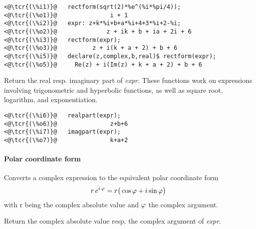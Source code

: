 \documentclass[../Maxima_Workbook.tex]{subfiles}
\begin{document}
\vspace{2mm}\begin{lstlisting}
<@\tcr{(\%i1)}@   rectform(sqrt(2)*%e^(%i*%pi/4));
<@\tcr{(\%o1)}@			      i + 1
<@\tcr{(\%i2)}@   expr: z+k*%i+b+a*%i+4+3*%i+2-%i;
<@\tcr{(\%o2)}@   		     z + ik + b + ia + 2i + 6
<@\tcr{(\%i3)}@   rectform(expr);
<@\tcr{(\%o3)}@		     z + i(k + a + 2) + b + 6
<@\tcr{(\%i5)}@   declare(z,complex,b,real)$ rectform(expr);
<@\tcr{(\%o5)}@		Re(z) + i(Im(z) + k + a + 2) + b + 6  
\end{lstlisting}\vspace{-1mm}

\lzz {} \hfill \tcr{[function]}

 \hfill \tcr{[function]}

\lz Return the real resp. imaginary part of \emph{expr}. These functions work on expressions involving trigonometric and hyperbolic functions, as well as square root, logarithm, and exponentiation. 

\vspace{2mm}\begin{lstlisting}
<@\tcr{(\%i6)}@   realpart(expr);
<@\tcr{(\%o6)}@			      z+b+6
<@\tcr{(\%i7)}@   imagpart(expr);
<@\tcr{(\%o7)}@			      k+a+2
\end{lstlisting}\vspace{-1mm}

\paragraph{Polar coordinate form} \mbox{}

\lzz {} \hfill \tcr{[function]}

\lz Converts a complex expression to the equivalent polar coordinate form
\begin{equation*}
	r \, e^{i \, \varphi} = r \big( \cos \varphi + i \sin \varphi \big)
\end{equation*}
with r being the complex absolute value and $ \varphi $ the complex argument.

\lzz {} \hfill \tcr{[function]}

 \hfill \tcr{[function]}

\lz Return the complex absolute value resp. the complex argument of \emph{expr}.
\end{document}
